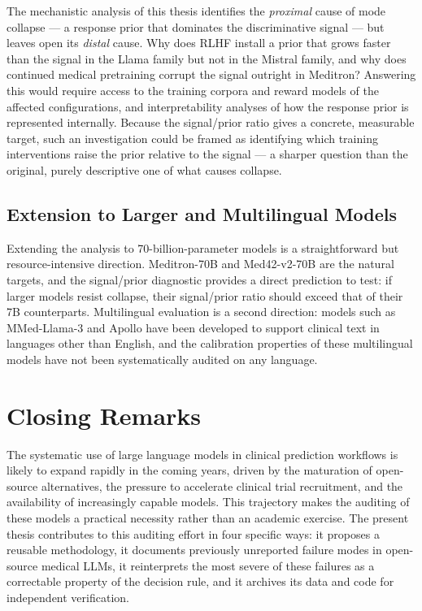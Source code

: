 The mechanistic analysis of this thesis identifies the \emph{proximal} 
cause of mode collapse --- a response prior that dominates the 
discriminative signal --- but leaves open its \emph{distal} cause. Why 
does RLHF install a prior that grows faster than the signal in the 
Llama family but not in the Mistral family, and why does continued 
medical pretraining corrupt the signal outright in Meditron? Answering 
this would require access to the training corpora and reward models of 
the affected configurations, and interpretability analyses of how the 
response prior is represented internally. Because the signal/prior ratio 
gives a concrete, measurable target, such an investigation could be 
framed as identifying which training interventions raise the prior 
relative to the signal --- a sharper question than the original, purely 
descriptive one of what causes collapse.

\subsection{Extension to Larger and Multilingual Models}
\label{subsec:conc-scale-future}

Extending the analysis to 70-billion-parameter models is a 
straightforward but resource-intensive direction. Meditron-70B and 
Med42-v2-70B are the natural targets, and the signal/prior diagnostic 
provides a direct prediction to test: if larger models resist collapse, 
their signal/prior ratio should exceed that of their 7B counterparts. 
Multilingual evaluation is a second direction: models such as 
MMed-Llama-3 and Apollo have been developed to support clinical text in 
languages other than English, and the calibration properties of these 
multilingual models have not been systematically audited on any 
language.

\section{Closing Remarks}
\label{sec:conc-closing}

The systematic use of large language models in clinical prediction 
workflows is likely to expand rapidly in the coming years, driven by 
the maturation of open-source alternatives, the pressure to accelerate 
clinical trial recruitment, and the availability of increasingly 
capable models. This trajectory makes the auditing of these models a 
practical necessity rather than an academic exercise. The present 
thesis contributes to this auditing effort in four specific ways: it 
proposes a reusable methodology, it documents previously unreported 
failure modes in open-source medical LLMs, it reinterprets the most 
severe of these failures as a correctable property of the decision 
rule, and it archives its data and code for independent verification.

